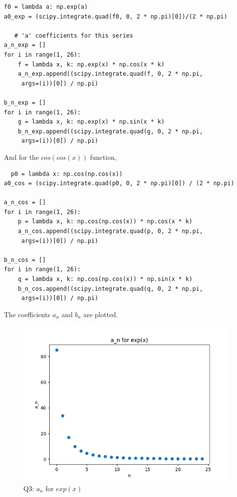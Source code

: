 \documentclass[11pt, a4paper]{article}
\begin{document}
  \begin{verbatim}
f0 = lambda a: np.exp(a)
a0_exp = (scipy.integrate.quad(f0, 0, 2 * np.pi)[0])/(2 * np.pi)

   # 'a' coefficients for this series
a_n_exp = []
for i in range(1, 26):
    f = lambda x, k: np.exp(x) * np.cos(x * k)
    a_n_exp.append((scipy.integrate.quad(f, 0, 2 * np.pi,
     args=(i))[0]) / np.pi)

b_n_exp = []
for i in range(1, 26):
    g = lambda x, k: np.exp(x) * np.sin(x * k)
    b_n_exp.append((scipy.integrate.quad(g, 0, 2 * np.pi,
     args=(i))[0]) / np.pi)

  \end{verbatim}  
  And for the $cos(cos(x))$ function,
  \begin{verbatim}
  p0 = lambda x: np.cos(np.cos(x))
a0_cos = (scipy.integrate.quad(p0, 0, 2 * np.pi)[0]) / (2 * np.pi)

a_n_cos = []
for i in range(1, 26):
    p = lambda x, k: np.cos(np.cos(x)) * np.cos(x * k)
    a_n_cos.append((scipy.integrate.quad(p, 0, 2 * np.pi,
     args=(i))[0]) / np.pi)

b_n_cos = []
for i in range(1, 26):
    q = lambda x, k: np.cos(np.cos(x)) * np.sin(x * k)
    b_n_cos.append((scipy.integrate.quad(q, 0, 2 * np.pi,
     args=(i))[0]) / np.pi)

  \end{verbatim}  
  The coefficients $a_{n}$ and $b_{n}$ are plotted.
  \begin{figure}[!tbh]
   	\centering
  \includegraphics[scale=0.5]{an-exp.png} 
    \caption{Q3: $a_{n}$ for $exp(x)$}
   	\label{fig:an for exp(x)}
   \end{figure}
   
\end{document}

